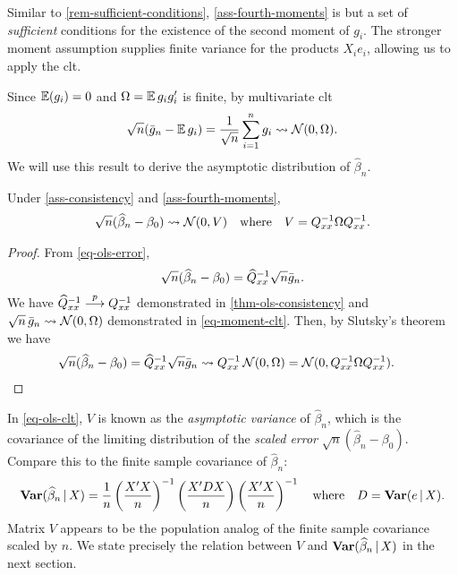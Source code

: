\documentclass[a4paper,12pt]{article}
\begin{document}
\begin{remark}
	Similar to \autoref{rem-sufficient-conditions},
	\autoref{ass-fourth-moments} is but a set of \emph{sufficient} conditions for the existence of the second moment of $g_i$.
	The stronger moment assumption supplies finite variance for the products $X_ie_i$,
	allowing us to apply the \gls{clt}.
\end{remark}

\begin{remark}
	Since $\operatorname{\mathbb{E}}(g_i)=0$ and $\Omega=\operatorname{\mathbb{E}} g_i g_i^{\prime}$ is finite,
	by multivariate \gls{clt}
	\begin{align}\label{eq-moment-clt}
		\sqrt{n}(\bar g_n-\operatorname{\mathbb{E}} g_i)
		=\frac1{\sqrt{n}}\sum_{i=1}^ng_i
		\overset{}{\leadsto}\operatorname{\mathcal{N}}(0,\Omega).
	\end{align}
	We will use this result to derive the asymptotic distribution of $\widehat\beta_n$.
\end{remark}

\begin{theorem}\label{thm-ols-normality}
	Under \autoref{ass-consistency} and \autoref{ass-fourth-moments},
	\begin{align}\label{eq-ols-clt}
		\sqrt{n}(\widehat\beta_n-\beta_0)
		\overset{}{\leadsto}\operatorname{\mathcal{N}}(0,V)
		\quad\text{where}\quad
		V=Q_{xx}^{-1}\Omega Q_{xx}^{-1}.
	\end{align}
\end{theorem}
\begin{proof}
	From \eqref{eq-ols-error},
	\begin{align*}
		\sqrt{n}(\widehat\beta_n-\beta_0)
		=\widehat Q_{xx}^{-1}\sqrt{n} \bar g_n.
	\end{align*}
	We have $\widehat Q_{xx}^{-1}\overset{p}{\longrightarrow} Q_{xx}^{-1}$ demonstrated in \autoref{thm-ols-consistency} and
	$\sqrt{n}\,\bar g_n\overset{}{\leadsto}\operatorname{\mathcal{N}}(0,\Omega)$ demonstrated in \eqref{eq-moment-clt}.
	Then, by Slutsky's theorem we have
	\begin{align}
		\sqrt{n}(\widehat\beta_n-\beta_0)
		&=\widehat Q_{xx}^{-1}\sqrt{n} \bar g_n
		\overset{}{\leadsto} Q_{xx}^{-1} \operatorname{\mathcal{N}}(0,\Omega)
		= \operatorname{\mathcal{N}}(0,Q_{xx}^{-1}\Omega Q_{xx}^{-1}).
		\qedhere
	\end{align}
\end{proof}

\begin{remark}
	In \eqref{eq-ols-clt}, $V$ is known as the \emph{asymptotic variance} of $\widehat\beta_n$,
	which is the covariance of the limiting distribution of the
	\emph{scaled error} $\sqrt{n}(\widehat\beta_n-\beta_0)$.
	Compare this to the finite sample covariance of $\widehat\beta_n$:
	\begin{align*}
		\operatorname{\text{\textrm{\upshape\textbf{Var}}}}(\widehat\beta_n\mathpunct{}|\mathpunct{} X)
		=\frac1n \left(\frac{X^{\prime} X}n \right)^{-1} \left(\frac{X^{\prime} D X}n \right)\left(\frac{X^{\prime} X}n \right)^{-1}
		\quad\text{where}\quad
		D=\operatorname{\text{\textrm{\upshape\textbf{Var}}}}(e\mathpunct{}|\mathpunct{} X).
	\end{align*}
	Matrix $V$ appears to be the population analog of the finite sample covariance scaled by $n$.
	We state precisely the relation between $V$ and $\operatorname{\text{\textrm{\upshape\textbf{Var}}}}(\widehat\beta_n\mathpunct{}|\mathpunct{} X)$ in the next section.
\end{remark}
\end{document}

